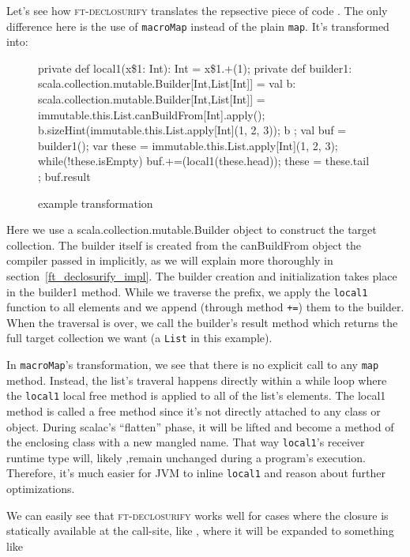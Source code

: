 Let's see how \textsc{ft-declosurify} translates the repsective piece of code
. The only difference here is the use of \texttt{macroMap} instead
of the plain \texttt{map}. It's transformed into:

\begin{figure}
\begin{scalaCode}
{
  private def local1(x\$1: Int): Int = x\$1.+(1);
  private def builder1: scala.collection.mutable.Builder[Int,List[Int]] = {
    val b: scala.collection.mutable.Builder[Int,List[Int]] =
immutable.this.List.canBuildFrom[Int].apply();
    b.sizeHint(immutable.this.List.apply[Int](1, 2, 3));
    b
  };
  val buf = builder1();
  var these = immutable.this.List.apply[Int](1, 2, 3);
  while(!these.isEmpty){
    buf.+=(local1(these.head));
    these = these.tail
  };
  buf.result
}
\end{scalaCode}
\caption[ example transformation]{ example transformation}
\end{figure}

Here we use a scala.\allowbreak{}collection.\allowbreak{}mutable.\allowbreak{}Builder object to construct the target
collection. The builder itself is created from the
canBuildFrom object the compiler passed in implicitly, as we will explain more thoroughly in section~\ref{ft_declosurify_impl}. 
The builder creation and initialization takes place in the
builder1 method. While we traverse the prefix, we apply the \texttt{local1} function to
all elements and we append (through method \texttt{+=}) them to the builder. When the
traversal is over, we call the builder's result method which returns the full
target collection we want (a \texttt{List} in this example).

In \texttt{macroMap}'s transformation, we see that there is no explicit call to any 
\texttt{map} method. Instead, the list's traveral happens directly within a while loop 
where the \texttt{local1} local free method is applied to all of the list's elements. 
The local1 method is called a free method since it's not directly attached to any class or object.
During scalac's ``flatten'' phase, it will be lifted and become a method of
the enclosing class with a new mangled name. That way \texttt{local1}'s receiver runtime type
will, likely ,remain unchanged during a program's execution. Therefore, it's much easier for JVM
to inline \texttt{local1} and reason about further optimizations.

We can easily see that \textsc{ft-declosurify} works well for cases where the closure
is statically available at the call-site, like ,
where it will be expanded to something like

